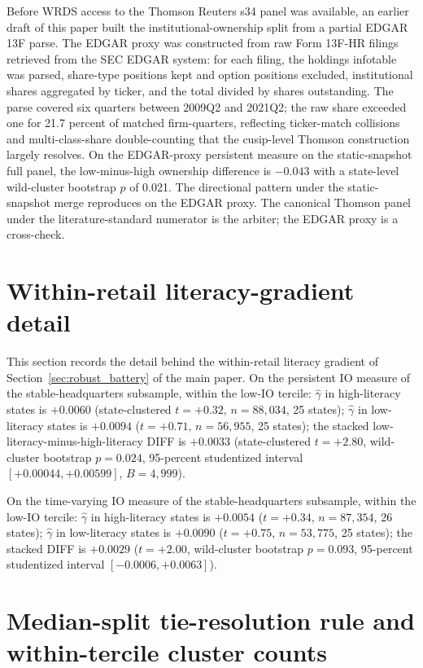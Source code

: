 \documentclass[12pt]{article}
\begin{document}
Before WRDS access to the Thomson Reuters s34 panel was available, an earlier draft of this paper built the institutional-ownership split from a partial EDGAR 13F parse. The EDGAR proxy was constructed from raw Form 13F-HR filings retrieved from the SEC EDGAR system: for each filing, the holdings infotable was parsed, share-type positions kept and option positions excluded, institutional shares aggregated by ticker, and the total divided by shares outstanding. The parse covered six quarters between 2009Q2 and 2021Q2; the raw share exceeded one for 21.7 percent of matched firm-quarters, reflecting ticker-match collisions and multi-class-share double-counting that the cusip-level Thomson construction largely resolves. On the EDGAR-proxy persistent measure on the static-snapshot full panel, the low-minus-high ownership difference is $-0.043$ with a state-level wild-cluster bootstrap $p$ of 0.021. The directional pattern under the static-snapshot merge reproduces on the EDGAR proxy. The canonical Thomson panel under the literature-standard numerator is the arbiter; the EDGAR proxy is a cross-check.

\section{Within-retail literacy-gradient detail}
\label{ia:withinretail}

This section records the detail behind the within-retail literacy gradient of Section~\ref{sec:robust_battery} of the main paper. On the persistent IO measure of the stable-headquarters subsample, within the low-IO tercile: $\hat\gamma$ in high-literacy states is $+0.0060$ (state-clustered $t = +0.32$, $n = 88{,}034$, 25 states); $\hat\gamma$ in low-literacy states is $+0.0094$ ($t = +0.71$, $n = 56{,}955$, 25 states); the stacked low-literacy-minus-high-literacy DIFF is $+0.0033$ (state-clustered $t = +2.80$, wild-cluster bootstrap $p = 0.024$, 95-percent studentized interval $[+0.00044, +0.00599]$, $B = 4{,}999$).

On the time-varying IO measure of the stable-headquarters subsample, within the low-IO tercile: $\hat\gamma$ in high-literacy states is $+0.0054$ ($t = +0.34$, $n = 87{,}354$, 26 states); $\hat\gamma$ in low-literacy states is $+0.0090$ ($t = +0.75$, $n = 53{,}775$, 25 states); the stacked DIFF is $+0.0029$ ($t = +2.00$, wild-cluster bootstrap $p = 0.093$, 95-percent studentized interval $[-0.0006, +0.0063]$).

\section{Median-split tie-resolution rule and within-tercile cluster counts}
\label{ia:medsplit}
\end{document}
